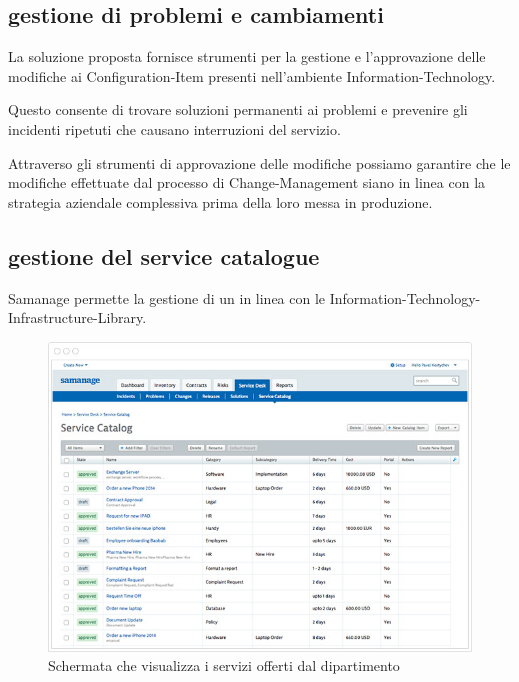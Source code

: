 \subsection[Gestione di problemi e cambiamenti]{gestione di problemi e cambiamenti}
\label{sd-problem-change-management}
La soluzione  proposta fornisce strumenti per la gestione e l'approvazione delle modifiche ai \ac{Configuration-Item} presenti nell'ambiente \acs{Information-Technology}.

Questo consente di trovare soluzioni permanenti ai problemi e prevenire gli incidenti ripetuti che causano interruzioni del servizio.

Attraverso gli strumenti di approvazione delle modifiche possiamo garantire che le modifiche effettuate dal processo di \ac{Change-Management} siano in linea con la strategia aziendale complessiva prima della loro messa in produzione.

\subsection[Gestione del service catalogue]{gestione del service catalogue}
\label{sd-service-catalogue-management}
Samanage permette la gestione di un  in linea con le  \ac{Information-Technology-Infrastructure-Library}.

\begin{figure}[htbp]
\centering
\includegraphics[scale=0.6]{Images/samanage/Service_catalogue.png}
\caption{Schermata che visualizza i servizi offerti dal dipartimento}
\label{sd-samanage-service-catalogue-img}
\end{figure}

